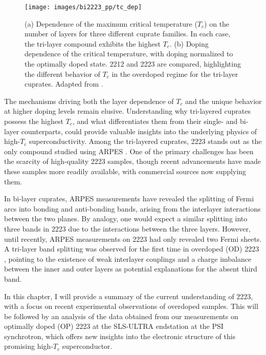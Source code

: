 \begin{figure}
	\centering
	\texttt{[image: images/bi2223\_pp/tc\_dep]}
	\caption{(a) Dependence of the maximum critical temperature ($T_c$) on the number of  layers for three different cuprate families. In each case, the tri-layer compound exhibits the highest $T_c$. (b) Doping dependence of the critical temperature, with doping normalized to the optimally doped state. 2212 and 2223 are compared, highlighting the different behavior of $T_c$ in the overdoped regime for the tri-layer cuprates. Adapted from \cite{luo_electronic_2023}.}
	\label{fig:tcdep}
\end{figure}

The mechanisms driving both the layer dependence of $T_c$ and the unique behavior at higher doping levels remain elusive.
Understanding why tri-layered cuprates possess the highest $T_c$, and what differentiates them from their single- and bi-layer counterparts, could provide valuable insights into the underlying physics of high-$T_c$ superconductivity.
Among the tri-layered cuprates, 2223 stands out as the only compound studied using ARPES \cite{feng_electronic_2002,muller_fermi_2002,sato_low_2002,matsui_bcs-like_2003,ideta_angle-resolved_2010, ideta_enhanced_2010, ideta_energy_2012,kunisada_observation_2017,ideta_hybridization_2021,luo_electronic_2023}.
One of the primary challenges has been the scarcity of high-quality 2223 samples, though recent advancements have made these samples more readily available, with commercial sources now supplying them.

In bi-layer cuprates, ARPES measurements have revealed the splitting of Fermi arcs into bonding and anti-bonding bands, arising from the interlayer interactions between the two  planes.
By analogy, one would expect a similar splitting into three bands in 2223 due to the interactions between the three  layers.
However, until recently, ARPES measurements on 2223 had only revealed two Fermi sheets.
A tri-layer band splitting was observed for the first time in overdoped (OD) 2223 \cite{luo_electronic_2023}, pointing to the existence of weak interlayer couplings and a charge imbalance between the inner and outer  layers as potential explanations for the absent third band.

In this chapter, I will provide a summary of the current understanding of 2223, with a focus on recent experimental observations of overdoped samples.
This will be followed by an analysis of the data obtained from our measurements on optimally doped (OP) 2223 at the SLS-ULTRA endstation at the PSI synchrotron, which offers new insights into the electronic structure of this promising high-$T_c$ superconductor.

